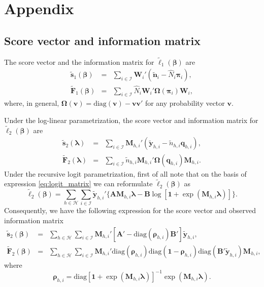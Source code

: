 
%

\section*{Appendix}
%
\subsection*{Score vector and information matrix}
%
The score vector and the information matrix for $\tilde{\ell}_1(\bm{\beta})$ are
\begin{eqnarray*}
\tilde{\bm{s}}_1(\bm{\beta}) &=& \sum_{i\in\mathcal{I}} \bm{W}_i'(\tilde{\bm{n}}_i-\hat{N}_i\bm\pi_i),\\
\tilde{\bm{F}}_1(\bm{\beta}) &=& \sum_{i\in\mathcal{I}} \hat{N}_i\bm{W}_i'\bm\Omega(\bm\pi_i)\bm{W}_i,
\end{eqnarray*}
where, in general, $\bm\Omega(\bm{v})=\text{diag}(\bm{v})-\bm{v}\bm{v}'$ for any probability vector $\bm{v}$.

Under the log-linear parametrization, the score vector and information matrix for $\tilde{\ell}_2(\bm{\beta})$ are
\begin{eqnarray*}
\tilde{\bm{s}}_2(\bm{\lambda}) &=& \sum_{i\in\mathcal{I}} \bm{M}_{h,i}'(\tilde{\bm{y}}_{h,i}-\tilde{n}_{h,i}\bm{q}_{h,i}),\\
\tilde{\bm{F}}_2(\bm{\lambda}) &=& \sum_{i\in\mathcal{I}} \tilde{n}_{h,i}\bm{M}_{h,i}'\bm\Omega(\bm{q}_{h,i})\bm{M}_{h,i}.
\end{eqnarray*}
Under the recursive logit parametrization, first of all note that on the basis of expression \eqref{eq:logit_matrix} we can reformulate $\tilde{\ell}_2(\bm{\beta})$ as
\[
\tilde{\ell}_2(\bm{\beta}) = \sum_{h\in\mathcal{H}}\sum_{i\in\mathcal{I}}\tilde{\bm{y}}_{h,i}'\{\bm{A}\bm{M}_{h,i}\bm{\lambda} - \bm{B}\log[\bm{1}+\exp(\bm{M}_{h,i}\bm{\lambda})]\}.
\]
Consequently, we have the following expression for the score vector and observed information matrix
\begin{eqnarray*}
\tilde{\bm{s}}_2(\bm{\beta}) &=& \sum_{h\in\mathcal{H}}\sum_{i\in\mathcal{I}} \bm{M}_{h,i}'[\bm{A}'-\text{diag}(\bm\rho_{h,i})\bm{B}']\tilde{\bm{y}}_{h,i},\\
\tilde{\bm{F}}_2(\bm{\beta}) &=& \sum_{h\in\mathcal{H}}\sum_{i\in\mathcal{I}} \bm{M}_{h,i}'\text{diag}(\bm\rho_{h,i})\text{diag}(\bm{1}-\bm\rho_{h,i})\text{diag}(\bm{B}'\tilde{\bm{y}}_{h,i})\bm{M}_{h,i},
\end{eqnarray*}
where
\[
\bm\rho_{h,i} = \text{diag}[\bm{1}+\exp(\bm{M}_{h,i}\bm{\lambda})]^{-1}\exp(\bm{M}_{h,i}\bm{\lambda}).
\]
%
